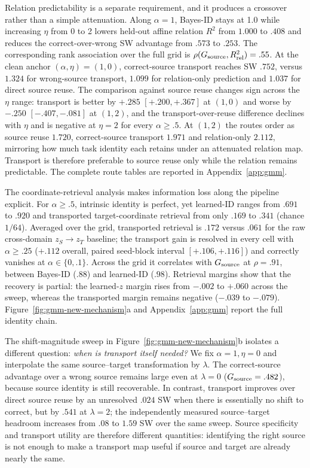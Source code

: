 \documentclass{article}
\begin{document}
Relation predictability is a separate requirement, and it produces a crossover rather than a simple attenuation. Along $\alpha=1$, Bayes-ID stays at 1.0 while increasing $\eta$ from 0 to 2 lowers held-out affine relation $R^2$ from $1.000$ to $.408$ and reduces the correct-over-wrong SW advantage from $.573$ to $.253$. The corresponding rank association over the full grid is $\rho(G_{\rm source},R^2_{\rm rel})=.55$. At the clean anchor $(\alpha,\eta)=(1,0)$, correct-source transport reaches SW $.752$, versus $1.324$ for wrong-source transport, $1.099$ for relation-only prediction and $1.037$ for direct source reuse. The comparison against source reuse changes sign across the $\eta$ range: transport is better by $+.285$ $[+.200,+.367]$ at $(1,0)$ and worse by $-.250$ $[-.407,-.081]$ at $(1,2)$, and the transport-over-reuse difference declines with $\eta$ and is negative at $\eta=2$ for every $\alpha\geq.5$. At $(1,2)$ the routes order as source reuse $1.720$, correct-source transport $1.971$ and relation-only $2.112$, mirroring how much task identity each retains under an attenuated relation map. Transport is therefore preferable to source reuse only while the relation remains predictable. The complete route tables are reported in Appendix~\ref{app:gmm}.

The coordinate-retrieval analysis makes information loss along the pipeline explicit. For $\alpha\geq.5$, intrinsic identity is perfect, yet learned-ID ranges from $.691$ to $.920$ and transported target-coordinate retrieval from only $.169$ to $.341$ (chance $1/64$). Averaged over the grid, transported retrieval is $.172$ versus $.061$ for the raw cross-domain $z_S\!\to z_T$ baseline; the transport gain is resolved in every cell with $\alpha\geq.25$ ($+.112$ overall, paired seed-block interval $[+.106,+.116]$) and correctly vanishes at $\alpha\in\{0,.1\}$. Across the grid it correlates with $G_{\rm source}$ at $\rho=.91$, between Bayes-ID ($.88$) and learned-ID ($.98$). Retrieval margins show that the recovery is partial: the learned-$z$ margin rises from $-.002$ to $+.060$ across the sweep, whereas the transported margin remains negative ($-.039$ to $-.079$). Figure~\ref{fig:gmm-new-mechanism}a and Appendix~\ref{app:gmm} report the full identity chain.

The shift-magnitude sweep in Figure~\ref{fig:gmm-new-mechanism}b isolates a different question: \emph{when is transport itself needed?} We fix $\alpha=1,\eta=0$ and interpolate the same source--target transformation by $\lambda$. The correct-source advantage over a wrong source remains large even at $\lambda=0$ ($G_{\rm source}=.482$), because source identity is still recoverable. In contrast, transport improves over direct source reuse by an unresolved $.024$ SW when there is essentially no shift to correct, but by $.541$ at $\lambda=2$; the independently measured source--target headroom increases from $.08$ to $1.59$ SW over the same sweep. Source specificity and transport utility are therefore different quantities: identifying the right source is not enough to make a transport map useful if source and target are already nearly the same.
\end{document}
